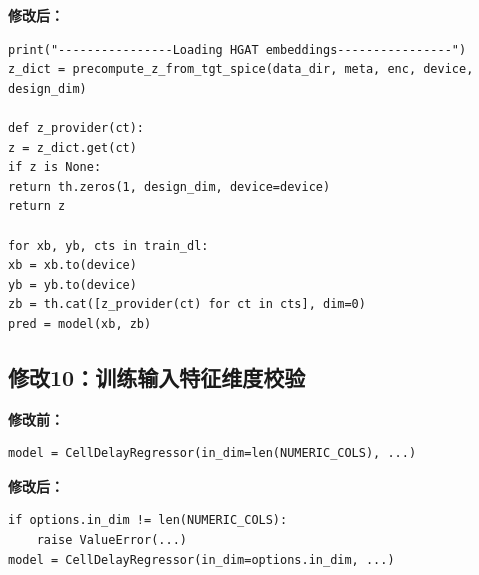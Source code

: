 \documentclass[11pt]{article}
\begin{document}
\textbf{修改后：}
\begin{lstlisting}
print("----------------Loading HGAT embeddings----------------")
z_dict = precompute_z_from_tgt_spice(data_dir, meta, enc, device, design_dim)

def z_provider(ct):
z = z_dict.get(ct)
if z is None:
return th.zeros(1, design_dim, device=device)
return z

for xb, yb, cts in train_dl:
xb = xb.to(device)
yb = yb.to(device)
zb = th.cat([z_provider(ct) for ct in cts], dim=0)
pred = model(xb, zb)
\end{lstlisting}

\subsection*{修改10：训练输入特征维度校验}
\textbf{修改前：}
\begin{lstlisting}
model = CellDelayRegressor(in_dim=len(NUMERIC_COLS), ...)
\end{lstlisting}

\textbf{修改后：}
\begin{lstlisting}
if options.in_dim != len(NUMERIC_COLS):
    raise ValueError(...)
model = CellDelayRegressor(in_dim=options.in_dim, ...)
\end{lstlisting}
\end{document}
